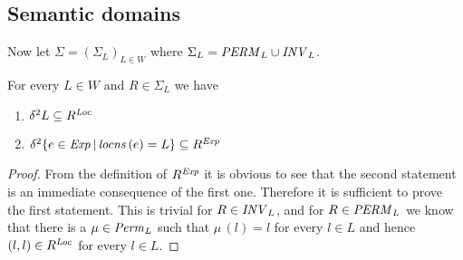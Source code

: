 \documentclass[12pt,a4paper]{report}
\newcommand{\PERM}{\nstyle{PERM}}
\newcommand{\INV}{\nstyle{INV}}
\begin{document}

\subsection{Semantic domains}

Now let $\Sigma = (\Sigma_L)_{L\in W}$ where $\Sigma_L = \PERM_L \cup \INV_L$.

\begin{lemma} \label{lemma:properties_of_Sigma_L}
  For every $L \in W$ and $R \in \Sigma_L$ we have
  \begin{enumerate}
    \item $\delta^2 L \subseteq R^{\mathit{Loc}}$
    \item $\delta^2 \{e\in\mathit{Exp}\,|\,\mathit{locns}\,(e)=L\} \subseteq R^{\mathit{Exp}}$
  \end{enumerate}
\end{lemma}

\begin{proof}
  From the definition of $R^{\mathit{Exp}}$ it is obvious to see that the second statement
  is an immediate consequence of the first one. Therefore it is sufficient to
  prove the first statement. This is trivial for $R \in \INV_L$, and for $R \in \PERM_L$
  we know that there is a $\mu\in\mathit{Perm}_L$ such that $\mu\,(l)=l$ for every $l \in L$ and
  hence $(l,l) \in R^{\mathit{Loc}}$ for every $l \in L$.
\end{proof}
\end{document}
